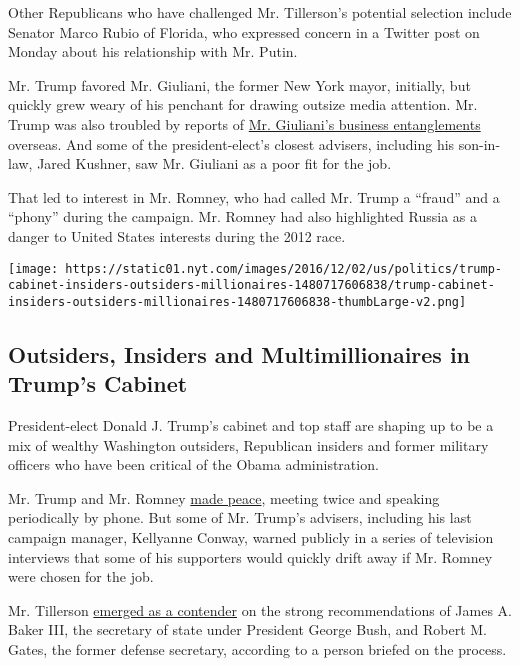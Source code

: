 Other Republicans who have challenged Mr. Tillerson's potential
selection include Senator Marco Rubio of Florida, who expressed concern
in a Twitter post on Monday about his relationship with Mr. Putin.

Mr. Trump favored Mr. Giuliani, the former New York mayor, initially,
but quickly grew weary of his penchant for drawing outsize media
attention. Mr. Trump was also troubled by reports of
\href{https://www.nytimes.com/2016/11/16/us/politics/donald-trump-cabinet-rudy-giuliani.html}{Mr.
Giuliani's business entanglements} overseas. And some of the
president-elect's closest advisers, including his son-in-law, Jared
Kushner, saw Mr. Giuliani as a poor fit for the job.

That led to interest in Mr. Romney, who had called Mr. Trump a ``fraud''
and a ``phony'' during the campaign. Mr. Romney had also highlighted
Russia as a danger to United States interests during the 2012 race.

\href{https://www.nytimes.com/interactive/2016/12/05/us/politics/trump-cabinet-insiders-outsiders-millionaires.html}{}

\texttt{[image: https://static01.nyt.com/images/2016/12/02/us/politics/trump-cabinet-insiders-outsiders-millionaires-1480717606838/trump-cabinet-insiders-outsiders-millionaires-1480717606838-thumbLarge-v2.png]}

\hypertarget{outsiders-insiders-and-multimillionaires-in-trumps-cabinet}{%
\subsection{Outsiders, Insiders and Multimillionaires in Trump's
Cabinet}\label{outsiders-insiders-and-multimillionaires-in-trumps-cabinet}}

President-elect Donald J. Trump's cabinet and top staff are shaping up
to be a mix of wealthy Washington outsiders, Republican insiders and
former military officers who have been critical of the Obama
administration.

Mr. Trump and Mr. Romney
\href{https://www.nytimes.com/2016/11/20/us/politics/donald-trump-mitt-romney-secretary-state.html}{made
peace}, meeting twice and speaking periodically by phone. But some of
Mr. Trump's advisers, including his last campaign manager, Kellyanne
Conway, warned publicly in a series of television interviews that some
of his supporters would quickly drift away if Mr. Romney were chosen for
the job.

Mr. Tillerson
\href{https://www.nytimes.com/2016/12/09/us/politics/rex-tillerson-secretary-of-state-exxon-donald-trump.html}{emerged
as a contender} on the strong recommendations of James A. Baker III, the
secretary of state under President George Bush, and Robert M. Gates, the
former defense secretary, according to a person briefed on the process.

